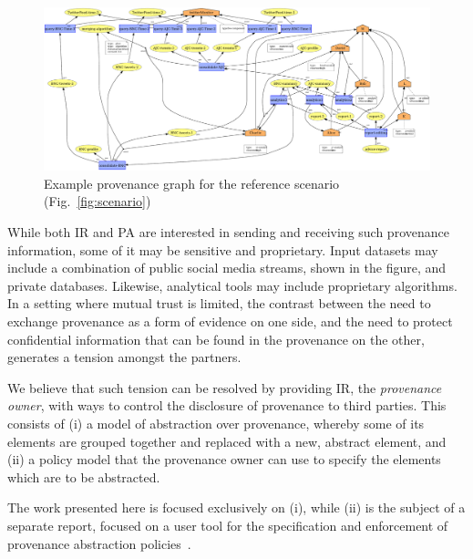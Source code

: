 \begin{figure}
\begin{center}
\includegraphics[width=\textwidth]{figures/IR-agents-delegation.pdf}
\caption{Example provenance graph for the reference scenario (Fig.~\ref{fig:scenario})}
\label{fig:graph-example}
\end{center}
\end{figure}

%
While both IR and PA are interested in sending and receiving such provenance information, some of it may be sensitive and proprietary. 
%
Input datasets may include a combination of public social media streams, shown in the figure, and private databases. Likewise, analytical tools may include proprietary algorithms.
%
In a setting where mutual trust is limited, the contrast between the need to exchange provenance as a form of evidence on one side, and the need to protect confidential information that can be found in the provenance on the other, generates a tension amongst the partners.

%
We believe that such tension can be resolved by providing IR, the \textit{provenance owner}, with ways to control the disclosure of provenance to third parties. This consists of (i) a model of abstraction over provenance, whereby some of its elements are grouped together and replaced with a new, abstract element, and (ii) a policy model that the provenance owner can use to specify the  elements which are to be abstracted.
%

The work presented here is focused exclusively on (i), while (ii)  is the subject of a separate report, focused on a user tool for the specification and enforcement of provenance abstraction policies~\citep{MBGCD14}.  
%
%






%

